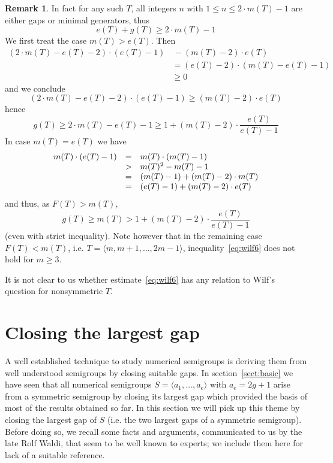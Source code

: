 \documentclass[a4paper,12pt,scrbook]{amsart}
\theoremstyle{plain}%
\theoremstyle{definition}
\newtheorem{rem}[satz]{Remark}
\begin{document}
\begin{rem}
In fact for any such $T$, all integers  $n$ with 
$1 \leq n \leq 2 \cdot m(T)-1$ are either gaps 
or minimal generators, thus 	
	$$ e(T) + g(T) \geq 2 \cdot m(T) - 1 $$
We first treat the case $m(T) > e(T)$. Then 
	$$ \begin{aligned}
	(2 \cdot m(T) - e(T) - 2)  \cdot (e(T)-1) &\,- (m(T) -2) \cdot e(T)  \\
	& = (e(T) -2) \cdot (m(T)-e(T) - 1) \\
	& \geq 0 
	\end{aligned} $$
and we conclude 
	$$ (2 \cdot m(T) - e(T) - 2)  \cdot (e(T)-1) \geq  (m(T) -2) \cdot e(T) $$
hence 
	\begin{equation}\label{eq:wilf6}  
	g(T) \geq 2 \cdot m(T) - e(T) - 1 \geq 1 + (m(T)-2) \cdot \frac {e(T)}{e(T)-1} 
	\end{equation}
In case $m(T) = e(T)$ we have 
	$$ \begin{array} {l c l} 
	m(T) \cdot (e(T)-1) & = & m(T) \cdot (m(T)-1) \\
	& > &  m(T)^2- m(T) - 1 \\
	& = & (m(T)-1) + (m(T)-2) \cdot m(T) \\
	& = & (e(T)-1) + (m(T)-2) \cdot e(T) \\
	\end{array} $$
and thus, as $F(T) > m(T)$, 
	$$ g(T) \geq m(T) > 1 + (m(T)-2) \cdot \frac {e(T)}{e(T)-1} $$
(even with strict inequality). Note however that in the remaining case $F(T) < m(T)$, 
i.e. $T = \langle m, m+1, \ldots, 2m-1 \rangle$, inequality~\eqref{eq:wilf6} does 
not hold for $m \geq 3$.

It is not clear to us whether estimate~\eqref{eq:wilf6} has any relation to 
Wilf's question for nonsymmetric $T$. 
\end{rem}


\section{Closing the largest gap}\label{sect:close_gap} 

A well established technique to study numerical semigroups is deriving them from 
well understood semigroups by closing suitable gaps. In section~\ref{sect:basic} we 
have seen that all numerical semigroups $S=\langle a_1, \ldots, a_e\rangle $ with 
$a_e = 2g+1$ arise from a symmetric semigroup by closing its largest gap which 
provided the basis of most of the results obtained so far. In this section we will 
pick up this theme by closing the largest gap of $S$ (i.e. the two largest gaps of 
a symmetric semigroup). Before doing so, we recall some facts and arguments, 
communicated to us by the late Rolf Waldi, that seem to be well known to experts;  
we include them here for lack of a suitable reference. 
\end{document}
